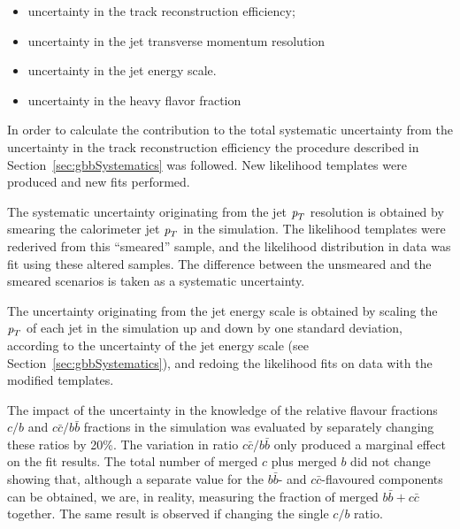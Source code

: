 \begin{itemize}\addtolength{\itemsep}{-0.4\baselineskip}
\item
uncertainty in the track reconstruction efficiency;
\item
uncertainty in the jet transverse momentum resolution 
\item
uncertainty in the jet energy scale.
\item
uncertainty in the heavy flavor fraction
\end{itemize}


In order to calculate the contribution to the total systematic uncertainty from the uncertainty in the track reconstruction efficiency the procedure described in Section~\ref{sec:gbbSystematics} was followed. New likelihood templates were produced and new fits performed. 

The systematic uncertainty originating from the jet  ${\emph{p}_{T}}$ resolution is obtained by smearing the calorimeter jet ${\emph{p}_{T}}$ in the simulation. The likelihood templates were rederived from this ``smeared'' sample, and the likelihood distribution in data was fit using these altered samples. The difference between the unsmeared and the smeared scenarios is taken as a systematic uncertainty. 

The uncertainty originating from the jet energy scale is obtained by scaling the ${\emph{p}_{T}}$ of each jet in the simulation up and down by one standard deviation, according to the uncertainty of the jet energy scale (see Section~\ref{sec:gbbSystematics}), and redoing the likelihood fits on data with the modified  %
templates.

The impact of the uncertainty in the knowledge of the relative flavour fractions $c/b$ and $c\bar{c}/b\bar{b}$ fractions in the simulation was evaluated by separately changing these ratios by 20\%. The variation in ratio $c\bar{c}/b\bar{b}$ only produced a marginal effect on the fit results. The total number of merged $c$ plus merged $b$ did not change showing that, although a separate value for the $b\bar{b}$- and $c\bar{c}$-flavoured components can be obtained, we are,  in reality, measuring the fraction of merged $b\bar{b}+c\bar{c}$ together. The same result is observed if changing the single $c/b$ ratio.

